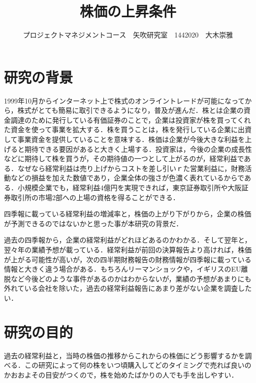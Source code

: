 \documentclass[uplatex,twocolumn,dvipdfmx]{jsarticle}
\title{\vspace{-5mm}\fontsize{14pt}{0pt}\selectfont 株価の上昇条件}
\author{\normalsize プロジェクトマネジメントコース　矢吹研究室　1442020　大木崇雅}
\date{}
\begin{document}
\fontsize{10.5pt}{\baselineskip}\selectfont
\maketitle





\section{研究の背景}

1999年10月からインターネット上で株式のオンライントレードが可能になってから，株式がとても簡易に取引できるようになり，普及が進んだ．株とは企業の資金調達のために発行している有価証券のことで，企業は投資家が株を買ってくれた資金を使って事業を拡大する．株を買うことは，株を発行している企業に出資して事業資金を提供していることを意味する．株価は企業が今後大きな利益を上げると期待できる要因があると大きく上場する．投資家は，今後の企業の成長性などに期待して株を買うが，その期待値の一つとして上がるのが，経常利益である．なぜなら経常利益は売り上げからコストを差し引いｒた営業利益に，財務活動などの損益を加えた数値であり，企業全体の強さが色濃く表れているからである．小規模企業でも，経常利益4億円を実現できれば，東京証券取引所や大阪証券取引所の市場2部への上場の資格を得ることができる．\cite{BA67886013}


四季報に載っている経常利益の増減率と，株価の上がり下がりから，企業の株価が予測できるのではないかと思った事が本研究の背景だ．

過去の四季報から，企業の経常利益がどれほどあるのかわかる．そして翌年と，翌々年の業績予想が載っている．経常利益が前回の決算報告より高ければ，株価が上がる可能性が高いが，次の四半期財務報告の財務情報が四季報に載っている情報と大きく違う場合がある．もちろんリーマンショックや，イギリスのEU離脱など今後どのような事件があるのかはわからないが，業績の予想があまりにも外れている会社を除いた，過去の経常利益報告にあまり差がない企業を調査したい．



\section{研究の目的}

過去の経常利益と，当時の株価の推移からこれからの株価にどう影響するかを調べる．この研究によって何の株をいつ頃購入してどのタイミングで売れば良いのかおおよその目安がつくので，株を始めたばかりの人でも手を出しやすい．
\end{document}
